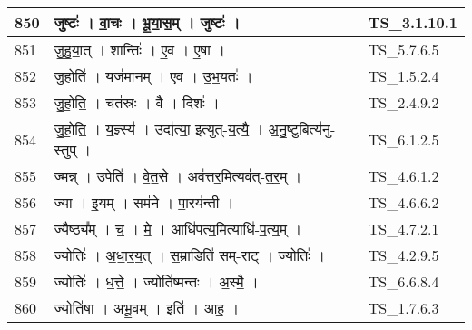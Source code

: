 \documentclass[17pt]{extarticle}
\begin{document}
\begin{longtable}{||p{0.4in}||p{4.9in}||p{0.9in}||}
    \hline
        
    850 & जुष्टः॑   ।   वा॒चः   ।   भू॒या॒स॒म्   ।   जुष्टः॑   ।    & TS\_3.1.10.1       \\
    
    \hline
        
    851 & जु॒हु॒या॒त्   ।   शान्तिः॑   ।   ए॒व   ।   ए॒षा   ।    & TS\_5.7.6.5       \\
    
    \hline
        
    852 & जु॒होति॑   ।   यज॑मानम्   ।   ए॒व   ।   उ॒भ॒यतः॑   ।    & TS\_1.5.2.4       \\
    
    \hline
        
    853 & जु॒हो॒ति॒   ।   चत॑स्रः   ।   वै   ।   दिशः॑   ।    & TS\_2.4.9.2       \\
    
    \hline
        
    854 & जु॒हो॒ति॒   ।   य॒ज्ञ्स्य॑   ।   उद्य॑त्या॒ इत्युत्{-}य॒त्यै॒   ।   अ॒नु॒ष्टुबित्य॑नु{-}स्तुप्   ।    & TS\_6.1.2.5       \\
    
    \hline
        
    855 & ज्मन्न्   ।   उपेति॑   ।   वे॒त॒से   ।   अव॑त्तर॒मित्यव॑त्{-}त॒र॒म्   ।    & TS\_4.6.1.2       \\
    
    \hline
        
    856 & ज्या   ।   इ॒यम्   ।   सम॑ने   ।   पा॒रय॑न्ती   ।    & TS\_4.6.6.2       \\
    
    \hline
        
    857 & ज्यैष्ठ्य᳚म्   ।   च॒   ।   मे॒   ।   आधि॑पत्य॒मित्याधि॑{-}प॒त्य॒म्   ।    & TS\_4.7.2.1       \\
    
    \hline
        
    858 & ज्योतिः॑   ।   अ॒धा॒र॒य॒त्   ।   स॒म्राडिति॑ सम्{-}राट्   ।   ज्योतिः॑   ।    & TS\_4.2.9.5       \\
    
    \hline
        
    859 & ज्योतिः॑   ।   ध॒त्ते॒   ।   ज्योति॑ष्मन्तः   ।   अ॒स्मै॒   ।    & TS\_6.6.8.4       \\
    
    \hline
        
    860 & ज्योति॑षा   ।   अ॒भू॒व॒म्   ।   इति॑   ।   आ॒ह॒   ।    & TS\_1.7.6.3       \\
    

\end{longtable}
\end{document}
